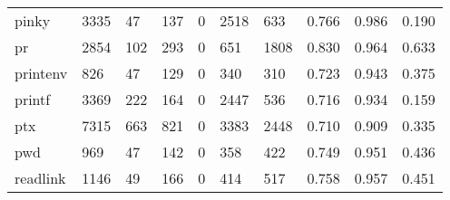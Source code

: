 \begin{longtable}{lp{1.3cm}p{1.3cm}p{1.3cm}p{1.3cm}p{1.3cm}p{1.3cm}p{1.3cm}p{1.3cm}p{1.3cm}}
pinky     &                   3335 &                                 47 &                               137 &                                0 &                              2518 &                             633 &                                   0.766 &                                  0.986 &                                0.190 \\
pr        &                   2854 &                                102 &                               293 &                                0 &                               651 &                            1808 &                                   0.830 &                                  0.964 &                                0.633 \\
printenv  &                    826 &                                 47 &                               129 &                                0 &                               340 &                             310 &                                   0.723 &                                  0.943 &                                0.375 \\
printf    &                   3369 &                                222 &                               164 &                                0 &                              2447 &                             536 &                                   0.716 &                                  0.934 &                                0.159 \\
ptx       &                   7315 &                                663 &                               821 &                                0 &                              3383 &                            2448 &                                   0.710 &                                  0.909 &                                0.335 \\
pwd       &                    969 &                                 47 &                               142 &                                0 &                               358 &                             422 &                                   0.749 &                                  0.951 &                                0.436 \\
readlink  &                   1146 &                                 49 &                               166 &                                0 &                               414 &                             517 &                                   0.758 &                                  0.957 &                                0.451 \\

\end{longtable}
